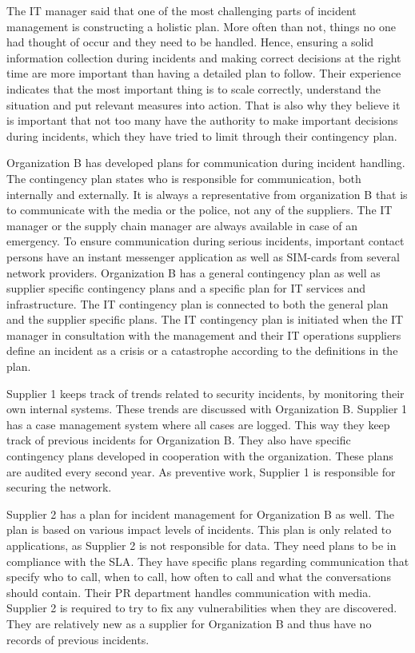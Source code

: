 The \acs{IT} manager said that one of the most challenging parts of incident management is constructing a holistic plan. More often than not, things no one had thought of occur and they need to be handled. Hence, ensuring a solid information collection during incidents and making correct decisions at the right time are more important than having a detailed plan to follow. Their experience indicates that the most important thing is to scale correctly, understand the situation and put relevant measures into action. That is also why they believe it is important that not too many have the authority to make important decisions during incidents, which they have tried to limit through their contingency plan.

Organization B has developed plans for communication during incident handling. The contingency plan states who is responsible for communication, both internally and externally. It is always a representative from organization B that is to communicate with the media or the police, not any of the suppliers. The IT manager or the supply chain manager are always available in case of an emergency. To ensure communication during serious incidents, important contact persons have an instant messenger application as well as SIM-cards from several network providers. Organization B has a general contingency plan as well as supplier specific contingency plans and a specific plan for IT services and infrastructure. The IT contingency plan is connected to both the general plan and the supplier specific plans. The IT contingency plan is initiated when the IT manager in consultation with the management and their IT operations suppliers define an incident as a crisis or a catastrophe according to the definitions in the plan.

Supplier 1 keeps track of trends related to security incidents, by monitoring their own internal systems. These trends are discussed with Organization B. Supplier 1 has a case management system where all cases are logged. This way they keep track of previous incidents for Organization B. They also have specific contingency plans developed in cooperation with the organization. These plans are audited every second year. As preventive work, Supplier 1 is responsible for securing the network.

Supplier 2 has a plan for incident management for Organization B as well. The plan is based on various impact levels of incidents. This plan is only related to applications, as Supplier 2 is not responsible for data. They need plans to be in compliance with the \ac{SLA}. They have specific plans regarding communication that specify who to call, when to call, how often to call and what the conversations should contain. Their PR department handles communication with media. Supplier 2 is required to try to fix any vulnerabilities when they are discovered. They are relatively new as a supplier for Organization B and thus have no records of previous incidents.

